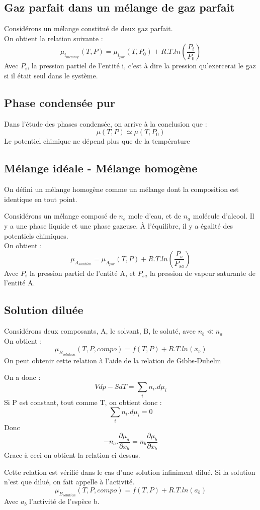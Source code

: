 \subsection{Gaz parfait dans un mélange de gaz parfait}
Considérons un mélange constitué de deux gaz parfait.\\
On obtient la relation suivante : 
$$\mu_{i_{melange}}(T,P) = \mu_{i_{pur}}(T,P_0) + R.T.ln\left(\dfrac{P_i}{P_0}\right)$$
Avec $P_i$, la pression partiel de l'entité i, c'est à dire la pression qu'exercerai le gaz si il était seul dans le système.
\subsection{Phase condensée pur}
Dans l'étude des phases condensée, on arrive à la conclusion que : 
$$\mu(T,P)\simeq\mu(T,P_0)$$
Le potentiel chimique ne dépend plus que de la température
\subsection{Mélange idéale - Mélange homogène}
\begin{de}
On défini un mélange homogène comme un mélange dont la composition est identique en tout point.
\end{de}
Considérons un mélange composé de $n_e$ mole d'eau, et de $n_a$ molécule d'alcool. Il y a une phase liquide et une phase gazeuse. À l'équilibre, il y a égalité des potentiels chimiques.\\
On obtient : 
$$\mu_{A_{solution}} = \mu_{A_{pur}}(T,P) + R.T.ln\left(\dfrac{P_a}{P_{sa}}\right)$$
Avec $P_i$ la pression partiel de l'entité A, et $P_{sa}$ la pression de vapeur saturante de l'entité A.
\subsection{Solution diluée}
Considérons deux composants, A, le solvant, B, le soluté, avec $n_b \ll n_a$\\
On obtient : 
$$\mu_{B_{solution}}(T,P,compo) = f(T,P) + R.T.ln(x_b)$$
On peut obtenir cette relation à l'aide de la relation de Gibbs-Duhelm
\begin{enon}
On a donc :
$$Vdp -SdT = \sum_i n_i.d\mu_i$$
Si P est constant, tout comme T, on obtient donc :
$$\sum_i n_i.d\mu_i = 0$$
Donc 
$$-n_a.\dfrac{\partial \mu_a}{\partial x_b} = n_b \dfrac{\partial \mu_b}{\partial x_b}$$
Grace à ceci on obtient la relation ci dessus.
\end{enon}
Cette relation est vérifié dans le cas d'une solution infiniment dilué. Si la solution n'est que dilué, on fait appelle à l'activité.
$$\mu_{B_{solution}}(T,P,compo) = f(T,P) + R.T.ln(a_b)$$
Avec $a_b$ l'activité de l'espèce b.
